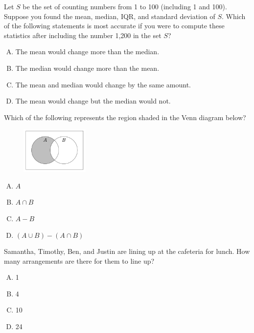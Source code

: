 \documentclass[12pt,letterpaper]{exam}
\begin{document}
\begin{questions}
\vfill

\question Let $S$ be the set of counting numbers from 1 to 100 (including 1 and 100). Suppose you found the mean, median, IQR, and standard deviation of $S$. Which of the following statements is most accurate if you were to compute these statistics after including the number 1,200 in the set $S$?
	\begin{enumerate}[A.]
	\item The mean would change more than the median.
	\item The median would change more than the mean.
	\item The mean and median would change by the same amount.
	\item The mean would change but the median would not.
	\end{enumerate}

\vfill

\question Which of the following represents the region shaded in the Venn diagram below?
	\begin{figure}[H]
	\centering
	\includegraphics[width=0.30\textwidth]{venn.png}
	\end{figure}
		
	\begin{enumerate}[A.]
	\item $A$
	\item $A \cap B$
	\item $A - B$
	\item $(A \cup B) - (A \cap B)$
	\end{enumerate}

\vfill

\question Samantha, Timothy, Ben, and Justin are lining up at the cafeteria for lunch. How many arrangements are there for them to line up?
 	\begin{enumerate}[A.]
	\item 1
	\item 4
	\item 10
	\item 24
	\end{enumerate}


\end{questions}
\end{document}
